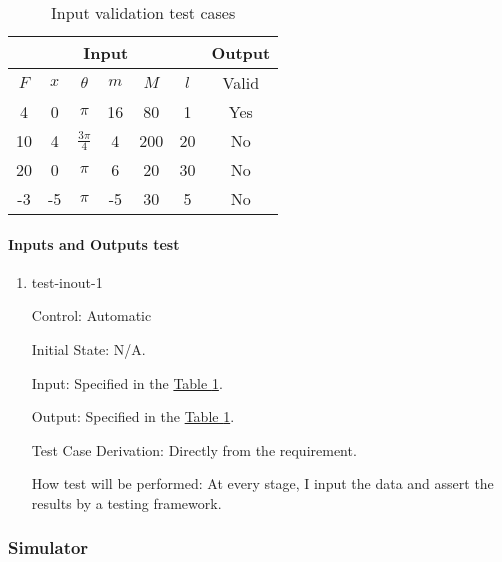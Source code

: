 \documentclass[12pt, titlepage]{article}
\begin{document}
\begin{table}[ht]
\centering
\caption{Input validation test cases} \label{table:input_constraints}
\vspace*{2mm}
 \begin{tabular}{|c c c c c c|c|} 
 \hline
 \multicolumn{6}{|c|}{Input}                     & Output \\ \hline 
  $F$ & $x$ & $\theta$         & $m$ & $M$ & $l$ & Valid  \\ \hline
  4   & 0   & $\pi$            & 16  & 80  &  1  & Yes    \\ \hline
  10  & 4   & $\frac{3\pi}{4}$ & 4   & 200 &  20 & No     \\ \hline
  20  & 0   & $\pi$            & 6   & 20  &  30 & No     \\ \hline
  -3  & -5  & $\pi$            & -5  & 30  &  5  & No     \\ \hline
\end{tabular}
\end{table}  

\paragraph{Inputs and Outputs test}

\begin{enumerate}

\item{test-inout-1\\}

Control: Automatic
					
Initial State: N/A.
					
Input: Specified in the \hyperref[table:input_constraints]{Table \ref*{table:input_constraints}}.
					
Output: Specified in the \hyperref[table:input_constraints]{Table \ref*{table:input_constraints}}.

Test Case Derivation: Directly from the requirement.
					
How test will be performed: 
At every stage, I input the data and assert the results by a testing framework.

\end{enumerate}

\subsubsection{Simulator} \label{func_test_simulator}
\end{document}
